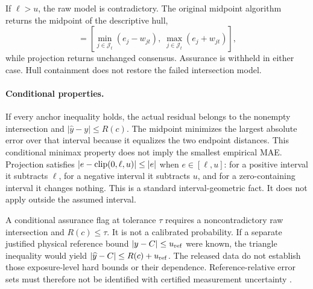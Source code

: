 If $\ell>u$, the raw model is contradictory. The original midpoint algorithm returns the midpoint of the descriptive hull,
\begin{equation}
[\ell^{\rm hull},u^{\rm hull}]=
\left[\min_{j\in\mathcal J_t}(e_j-w_{jt}),\;
\max_{j\in\mathcal J_t}(e_j+w_{jt})\right],
\end{equation}
while projection returns unchanged consensus. Assurance is withheld in either case. Hull containment does not restore the failed intersection model.

\paragraph{Conditional properties.}
If every anchor inequality holds, the actual residual belongs to the nonempty intersection and $|\widehat y-y|\leq R(c)$. The midpoint minimizes the largest absolute error over that interval because it equalizes the two endpoint distances. This conditional minimax property does not imply the smallest empirical MAE. Projection satisfies $|e-\operatorname{clip}(0,\ell,u)|\leq|e|$ when $e\in[\ell,u]$: for a positive interval it subtracts $\ell$, for a negative interval it subtracts $u$, and for a zero-containing interval it changes nothing. This is a standard interval-geometric fact. It does not apply outside the assumed interval.

A conditional assurance flag at tolerance $\tau$ requires a noncontradictory raw intersection and $R(c)\leq\tau$. It is not a calibrated probability. If a separate justified physical reference bound $|y-C|\leq u_{\rm ref}$ were known, the triangle inequality would yield $|\widehat y-C|\leq R(c)+u_{\rm ref}$. The released data do not establish those exposure-level hard bounds or their dependence. Reference-relative error sets must therefore not be identified with certified measurement uncertainty \cite{jcgm100,jcgm200}.

